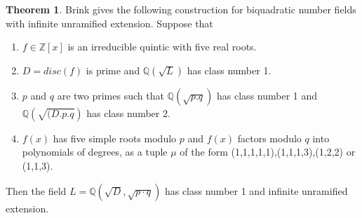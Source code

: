 \documentclass[12pt]{extarticle}
\newcommand{\Q}{\mathbb{Q}}
\newcommand{\Z}{\mathbb{Z}}
\newcommand{\<}{\langle}
\renewcommand{\>}{\rangle}
\theoremstyle{definition}
\newtheorem{theorem}{Theorem}
\begin{document}
\begin{theorem}

Brink \cite{BRINK} gives the following construction for biquadratic number fields with infinite unramified extension. Suppose that \begin{enumerate}
    \item $f\in \Z[x]$ is an irreducible quintic with five real roots.
    \item $D = disc(f)$ is prime and $\Q(\sqrt{L})$ has class number 1.
    \item $p$ and $q$ are two primes such that $\Q(\sqrt{p.q})$ has class number 1 and $\Q\left(\sqrt{(D.p.q}\right)$ has class number 2.
    \item $f(x)$ has five simple roots modulo $p$ and $f(x)$ factors modulo $q$ into polynomials of degrees, as a tuple $\mu$ of the form (1,1,1,1,1),(1,1,1,3),(1,2,2) or (1,1,3).
\end{enumerate}
Then the field $L=\Q\left(\sqrt{D},\sqrt{p \cdot q}\right)$ has class number 1 and infinite unramified extension.
\end{theorem}
\end{document}
